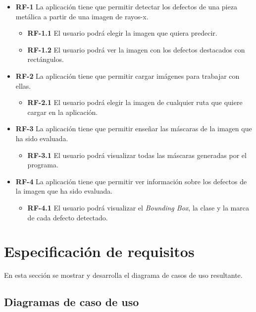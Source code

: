 \begin{itemize}

    \item \textbf{RF-1} La aplicación tiene que permitir detectar los defectos de una pieza metálica a partir de una imagen de rayos-x.
    \begin{itemize}
	    \item \textbf{RF-1.1} El usuario podrá elegir la imagen que quiera predecir.
	    \item \textbf{RF-1.2} El usuario podrá ver la imagen con los defectos destacados con rectángulos.
	\end{itemize}
	
	\item \textbf{RF-2} La aplicación tiene que permitir cargar imágenes para trabajar con ellas.
	\begin{itemize}
	\item \textbf{RF-2.1} El usuario podrá elegir la imagen de cualquier ruta que quiere cargar en la aplicación.
	\end{itemize}
	
	\item \textbf{RF-3} La aplicación tiene que permitir enseñar las máscaras de la imagen que ha sido evaluada.
    \begin{itemize}
	    \item \textbf{RF-3.1} El usuario podrá visualizar todas las máscaras generadas por el programa.
	\end{itemize}
	
	\item \textbf{RF-4} La aplicación tiene que permitir ver información sobre los defectos de la imagen que ha sido evaluada.
    \begin{itemize}
	    \item \textbf{RF-4.1} El usuario podrá visualizar el \textit{Bounding Box}, la clase y la marca de cada defecto detectado.
	\end{itemize}
\end{itemize}

\section{Especificación de requisitos}

En esta sección se mostrar y desarrolla el diagrama de casos de uso resultante.

\subsection{Diagramas de caso de uso}

